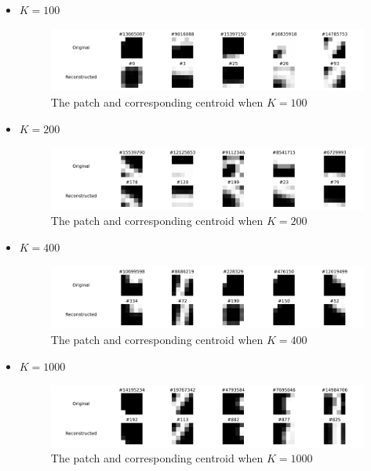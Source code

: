 \documentclass{article}
\begin{document}
\begin{itemize}
    \item $K = 100$
    \begin{figure}[htbp!]
        \centering
        \includegraphics[width = 0.9 \textwidth]{K-means/Result/Patches/100-clusters-reconstruction.png}
        \caption{The patch and corresponding centroid when $K = 100$}
        \label{fig:enter-label}
    \end{figure}

        \item $K = 200$
    \begin{figure}[htbp!]
        \centering
        \includegraphics[width = 0.9 \textwidth]{K-means/Result/Patches/200-clusters-reconstruction.png}
        \caption{The patch and corresponding centroid when $K = 200$}
        \label{fig:enter-label}
    \end{figure}

        \item $K = 400$
    \begin{figure}[htbp!]
        \centering
        \includegraphics[width = 0.9 \textwidth]{K-means/Result/Patches/400-clusters-reconstruction.png}
        \caption{The patch and corresponding centroid when $K = 400$}
        \label{fig:enter-label}
    \end{figure}
    \clearpage

        \item $K = 1000$
    \begin{figure}[htbp!]
        \centering
        \includegraphics[width = 0.9 \textwidth]{K-means/Result/Patches/1000-clusters-reconstruction.png}
        \caption{The patch and corresponding centroid when $K = 1000$}
        \label{fig:enter-label}
    \end{figure}


\end{itemize}
\end{document}
